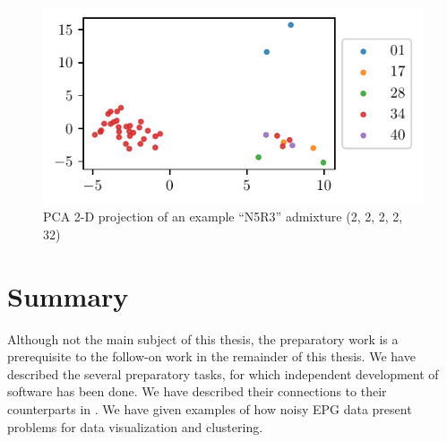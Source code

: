 \begin{figure}
\centering
\includegraphics{./figures/data_visualization/N5R3[0]-PCA, X_heights_normalized_log.pdf}
\caption{PCA 2-D projection of an example ``N5R3'' admixture (2, 2, 2, 2, 32)}
\label{fig:N5R3[0]-PCA, X_heights_normalized_log}
\end{figure}

\section{Summary}

Although not the main subject of this thesis, the preparatory work is a prerequisite to the follow-on work in the remainder of this thesis. We have described the several preparatory tasks, for which independent development of software has been done. We have described their connections to their counterparts in \cite{odonnell_clustering_2021}. We have given examples of how noisy EPG data present problems for data visualization and clustering.
